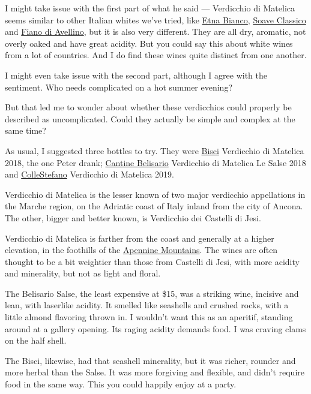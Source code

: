 I might take issue with the first part of what he said --- Verdicchio di
Matelica seems similar to other Italian whites we've tried, like
\href{https://www.nytimes.com/2018/04/26/dining/drinks/wine-school-etna-bianco-sicily.html}{Etna
Bianco},
\href{https://www.nytimes.com/2019/06/06/dining/drinks/wine-school-soave-classico.html}{Soave
Classico} and
\href{https://www.nytimes.com/2018/05/31/dining/drinks/wine-school-fiano.html}{Fiano
di Avellino}, but it is also very different. They are all dry, aromatic,
not overly oaked and have great acidity. But you could say this about
white wines from a lot of countries. And I do find these wines quite
distinct from one another.

I might even take issue with the second part, although I agree with the
sentiment. Who needs complicated on a hot summer evening?

But that led me to wonder about whether these verdicchios could properly
be described as uncomplicated. Could they actually be simple and complex
at the same time?

As usual, I suggested three bottles to try. They were
\href{https://www.bisci.it/en/}{Bisci} Verdicchio di Matelica 2018, the
one Peter drank;
\href{https://portovinoitaliano.com/producers/cantine-belisario/}{Cantine
Belisario} Verdicchio di Matelica Le Salse 2018 and
\href{https://www.collestefano.com/en/}{ColleStefano} Verdicchio di
Matelica 2019.

Verdicchio di Matelica is the lesser known of two major verdicchio
appellations in the Marche region, on the Adriatic coast of Italy inland
from the city of Ancona. The other, bigger and better known, is
Verdicchio dei Castelli di Jesi.

Verdicchio di Matelica is farther from the coast and generally at a
higher elevation, in the foothills of the
\href{https://www.britannica.com/place/Apennine-Range}{Apennine
Mountains}. The wines are often thought to be a bit weightier than those
from Castelli di Jesi, with more acidity and minerality, but not as
light and floral.

The Belisario Salse, the least expensive at \$15, was a striking wine,
incisive and lean, with laserlike acidity. It smelled like seashells and
crushed rocks, with a little almond flavoring thrown in. I wouldn't want
this as an aperitif, standing around at a gallery opening. Its raging
acidity demands food. I was craving clams on the half shell.

The Bisci, likewise, had that seashell minerality, but it was richer,
rounder and more herbal than the Salse. It was more forgiving and
flexible, and didn't require food in the same way. This you could
happily enjoy at a party.

